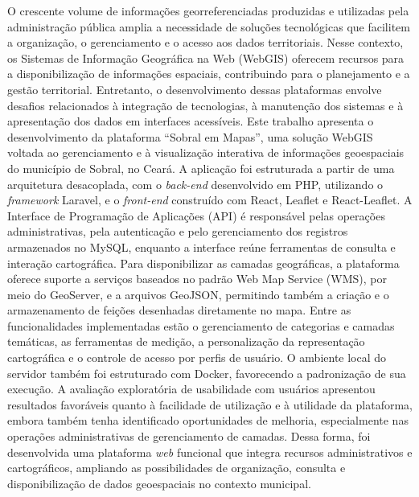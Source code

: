 
O crescente volume de informações georreferenciadas produzidas e utilizadas pela administração pública amplia a necessidade de soluções tecnológicas que facilitem a organização, o gerenciamento e o acesso aos dados territoriais. Nesse contexto, os Sistemas de Informação Geográfica na Web (WebGIS) oferecem recursos para a disponibilização de informações espaciais, contribuindo para o planejamento e a gestão territorial. Entretanto, o desenvolvimento dessas plataformas envolve desafios relacionados à integração de tecnologias, à manutenção dos sistemas e à apresentação dos dados em interfaces acessíveis. Este trabalho apresenta o desenvolvimento da plataforma ``Sobral em Mapas'', uma solução WebGIS voltada ao gerenciamento e à visualização interativa de informações geoespaciais do município de Sobral, no Ceará. A aplicação foi estruturada a partir de uma arquitetura desacoplada, com o \textit{back-end} desenvolvido em PHP, utilizando o \textit{framework} Laravel, e o \textit{front-end} construído com React, Leaflet e React-Leaflet. A Interface de Programação de Aplicações (API) é responsável pelas operações administrativas, pela autenticação e pelo gerenciamento dos registros armazenados no MySQL, enquanto a interface reúne ferramentas de consulta e interação cartográfica. Para disponibilizar as camadas geográficas, a plataforma oferece suporte a serviços baseados no padrão Web Map Service (WMS), por meio do GeoServer, e a arquivos GeoJSON, permitindo também a criação e o armazenamento de feições desenhadas diretamente no mapa. Entre as funcionalidades implementadas estão o gerenciamento de categorias e camadas temáticas, as ferramentas de medição, a personalização da representação cartográfica e o controle de acesso por perfis de usuário. O ambiente local do servidor também foi estruturado com Docker, favorecendo a padronização de sua execução. A avaliação exploratória de usabilidade com usuários apresentou resultados favoráveis quanto à facilidade de utilização e à utilidade da plataforma, embora também tenha identificado oportunidades de melhoria, especialmente nas operações administrativas de gerenciamento de camadas. Dessa forma, foi desenvolvida uma plataforma \textit{web} funcional que integra recursos administrativos e cartográficos, ampliando as possibilidades de organização, consulta e disponibilização de dados geoespaciais no contexto municipal.

